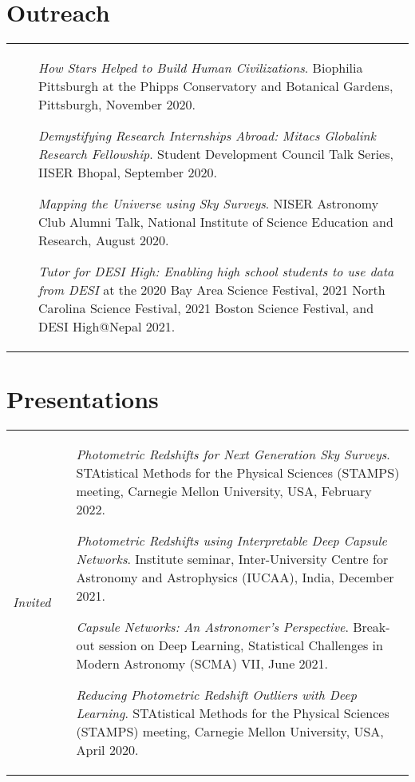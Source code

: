 \documentclass[10pt,a4paper,roman]{moderncv} %
\begin{document}
\section{Outreach}
\begin{tabular}{m{2.4cm} m{0.3cm} m{15cm}}
 & & \begin{etaremune}\item \textit{How Stars Helped to Build Human Civilizations}. Biophilia Pittsburgh at the Phipps Conservatory and Botanical Gardens, Pittsburgh, November 2020.
\item \textit{Demystifying Research Internships Abroad: Mitacs Globalink Research Fellowship}. Student Development
Council Talk Series, IISER Bhopal, September 2020.
\item \textit{Mapping the Universe using Sky Surveys}. NISER Astronomy Club Alumni Talk, National Institute of Science Education and Research, August 2020.
\item \textit{Tutor for DESI High: Enabling high school students to use data from DESI} at the 2020 Bay Area Science Festival, 2021 North Carolina Science Festival, 2021 Boston Science Festival, and DESI High@Nepal 2021.
\end{etaremune}
\end{tabular}

\section{Presentations}
\begin{tabular}{m{2.4cm} |m{0.3cm} m{15cm}}
 \emph{Invited} & &  \begin{etaremune}
    \item \textit{Photometric Redshifts for Next Generation Sky Surveys}. STAtistical Methods for the Physical Sciences (STAMPS) meeting, Carnegie Mellon University, USA, February 2022.
    \item \textit{Photometric Redshifts using Interpretable Deep Capsule Networks}. Institute seminar, Inter-University Centre for Astronomy and Astrophysics (IUCAA), India,  December 2021.
     \item \textit{Capsule Networks: An Astronomer's Perspective}. Break-out session on Deep Learning, Statistical Challenges in Modern Astronomy (SCMA) VII,  June 2021.
    \item \textit{Reducing Photometric Redshift Outliers with Deep Learning}. STAtistical Methods for the Physical Sciences (STAMPS) meeting, Carnegie Mellon University, USA, April 2020.
\end{etaremune}
\end{tabular}
 
\end{document}
